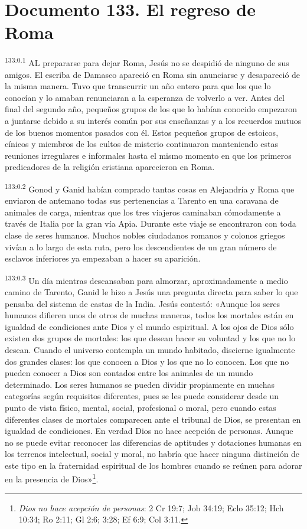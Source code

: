 \chapter{Documento 133. El regreso de Roma}
\par 
\textsuperscript{133:0.1} AL prepararse para dejar Roma, Jesús no se despidió de ninguno de sus amigos. El escriba de Damasco apareció en Roma sin anunciarse y desapareció de la misma manera. Tuvo que transcurrir un año entero para que los que lo conocían y lo amaban renunciaran a la esperanza de volverlo a ver. Antes del final del segundo año, pequeños grupos de los que lo habían conocido empezaron a juntarse debido a su interés común por sus enseñanzas y a los recuerdos mutuos de los buenos momentos pasados con él. Estos pequeños grupos de estoicos, cínicos y miembros de los cultos de misterio continuaron manteniendo estas reuniones irregulares e informales hasta el mismo momento en que los primeros predicadores de la religión cristiana aparecieron en Roma.

\par 
\textsuperscript{133:0.2} Gonod y Ganid habían comprado tantas cosas en Alejandría y Roma que enviaron de antemano todas sus pertenencias a Tarento en una caravana de animales de carga, mientras que los tres viajeros caminaban cómodamente a través de Italia por la gran vía Apia. Durante este viaje se encontraron con toda clase de seres humanos. Muchos nobles ciudadanos romanos y colonos griegos vivían a lo largo de esta ruta, pero los descendientes de un gran número de esclavos inferiores ya empezaban a hacer su aparición.

\par 
\textsuperscript{133:0.3} Un día mientras descansaban para almorzar, aproximadamente a medio camino de Tarento, Ganid le hizo a Jesús una pregunta directa para saber lo que pensaba del sistema de castas de la India. Jesús contestó: «Aunque los seres humanos difieren unos de otros de muchas maneras, todos los mortales están en igualdad de condiciones ante Dios y el mundo espiritual. A los ojos de Dios sólo existen dos grupos de mortales: los que desean hacer su voluntad y los que no lo desean. Cuando el universo contempla un mundo habitado, discierne igualmente dos grandes clases: los que conocen a Dios y los que no lo conocen. Los que no pueden conocer a Dios son contados entre los animales de un mundo determinado. Los seres humanos se pueden dividir propiamente en muchas categorías según requisitos diferentes, pues se les puede considerar desde un punto de vista físico, mental, social, profesional o moral, pero cuando estas diferentes clases de mortales comparecen ante el tribunal de Dios, se presentan en igualdad de condiciones. En verdad Dios no hace acepción de personas. Aunque no se puede evitar reconocer las diferencias de aptitudes y dotaciones humanas en los terrenos intelectual, social y moral, no habría que hacer ninguna distinción de este tipo en la fraternidad espiritual de los hombres cuando se reúnen para adorar en la presencia de Dios»\footnote{\textit{Dios no hace acepción de personas}: 2 Cr 19:7; Job 34:19; Eclo 35:12; Hch 10:34; Ro 2:11; Gl 2:6; 3:28; Ef 6:9; Col 3:11.}.

